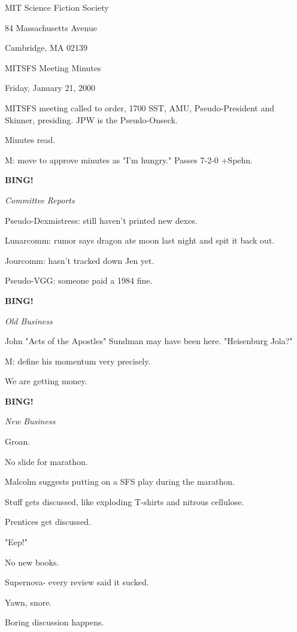 \documentclass[12pt]{article}
\newcommand{\bing}{{\bf BING!} }
\newcommand{\goto}[1]{\bing \vskip 12pt \centerline{{\em{#1}}}}
\begin{document}
\begin{center}

MIT Science Fiction Society 

84 Massachusetts Avenue

Cambridge, MA 02139

\vspace{12pt}

MITSFS Meeting Minutes 

Friday, January 21, 2000

\end{center}
 
\vspace{18pt}

\setlength{\parskip}{6pt}

\noindent
MITSFS meeting called to order, 1700 SST, AMU, Pseudo-President and
Skinner, presiding.  JPW is the Pseudo-Onseck.

Minutes read.

M: move to approve minutes as "I'm hungry." Passes 7-2-0 +Spehn.

\goto{Committee Reports}

Pseudo-Dexmistress: still haven't printed new dexes.

Lunarcomm: rumor says dragon ate moon last night and spit it back out.

Jourcomm: hasn't tracked down Jen yet.

Pseudo-VGG: someone paid a 1984 fine.

\goto{Old Business}

John "Acts of the Apostles" Sundman may have been here. "Heisenburg Jola?"

M: define his momentum very precisely.

We are getting money.

\goto{New Business}

Groan.

No slide for marathon.

Malcolm suggests putting on a SFS play during the marathon.

Stuff gets discussed, like exploding T-shirts and nitrous cellulose.

Prentices get discussed.

"Eep!"

No new books.

Supernova- every review said it sucked.

Yawn, snore.

Boring discussion happens.
\end{document}
